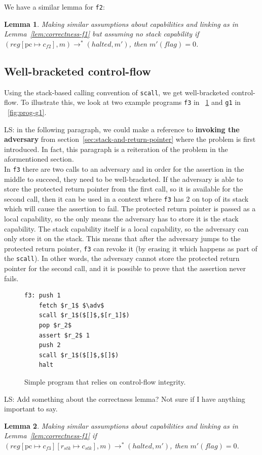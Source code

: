 \documentclass[compsoc,conference,letterpaper,fleqn]{IEEEtran}
\newtheorem{lemma}{Lemma}
\newcommand{\update}[2]{[#1 \mapsto #2]}
\newcommand\lau[1]{{\color{purple} \sf \footnotesize {LS: #1}}\\}
\newcommand{\var}[1]{\mathit{#1}}
\newcommand{\pcreg}{\mathrm{pc}}
\newcommand{\reg}{\var{reg}}
\newcommand{\adv}{\var{adv}}
\newcommand{\stk}{\var{stk}}
\newcommand{\flag}{\var{flag}}
\newcommand{\halted}{\mathit{halted}}
\newcommand{\step}[1][]{\rightarrow_{#1}}
\begin{document}
We have a similar lemma for \texttt{f2}:
\begin{lemma}
  \label{lem:correctness-f2}
  Making similar assumptions about capabilities and linking as in
  Lemma~\ref{lem:correctness-f1} but assuming no stack capability
  if $(\reg\update{\pcreg}{c_{f2}},m) \step^* (\halted,m')$, then $m'(\flag) = 0$.
\end{lemma}

\subsection{Well-bracketed control-flow} 
Using the stack-based calling convention of \texttt{scall}, we get
well-bracketed control-flow. To illustrate this, we look at
two example programs \texttt{f3} in \figurename~\ref{fig:prog-f3} and
\texttt{g1} in \figurename~\ref{fig:prog-g1}.

\lau{in the following paragraph, we could make a reference to
  \textbf{invoking the adversary} from
  section~\ref{sec:stack-and-return-pointer} where the problem is
  first introduced. In fact, this paragraph is a reiteration of the
  problem in the aformentioned section.}
In \texttt{f3} there are two calls to an adversary and in order for
the assertion in the middle to succeed, they need to be
well-bracketed. If the adversary is able to store the protected return
pointer from the first call, so it is available for the second call, then it can be used
in a context where \texttt{f3} has $2$ on top of its stack which will cause the
assertion to fail. The protected return pointer is passed as a local
capability, so the only means the adversary has to store it is the
stack capability. The stack capability itself is a local capability,
so the adversary can only store it on the stack. This means that after
the adversary jumps to the protected return pointer, \texttt{f3} can
revoke it (by erasing it which happens as part of the
\texttt{scall}). In other words, the adversary cannot store the
protected return pointer for the second call, and it is possible to
prove that the assertion never fails.
\begin{figure}[htbp]
  \centering
  \begin{lstlisting}
f3: push 1
    fetch $r_1$ $\adv$
    scall $r_1$($[]$,$[r_1]$)
    pop $r_2$
    assert $r_2$ 1
    push 2
    scall $r_1$($[]$,$[]$)
    halt
\end{lstlisting}
  \caption{Simple program that relies on control-flow integrity.}
  \label{fig:prog-f3}
\end{figure}
\lau{Add something about the correctness lemma? Not sure if I have
  anything important to say.}
\begin{lemma}
  \label{lem:correctness-f3}
  Making similar assumptions about capabilities and linking as in
  Lemma~\ref{lem:correctness-f1}
  if $(\reg\update{\pcreg}{c_{f3}}\update{r_\stk}{c_\stk},m) \step^*
  (\halted,m')$, then $m'(\flag) = 0$.
\end{lemma}
\end{document}
